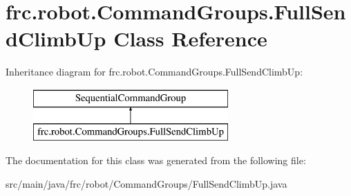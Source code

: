 \hypertarget{classfrc_1_1robot_1_1_command_groups_1_1_full_send_climb_up}{}\section{frc.\+robot.\+Command\+Groups.\+Full\+Send\+Climb\+Up Class Reference}
\label{classfrc_1_1robot_1_1_command_groups_1_1_full_send_climb_up}
Inheritance diagram for frc.\+robot.\+Command\+Groups.\+Full\+Send\+Climb\+Up\+:\begin{figure}[H]
\begin{center}
\leavevmode
\includegraphics[height=2.000000cm]{classfrc_1_1robot_1_1_command_groups_1_1_full_send_climb_up}
\end{center}
\end{figure}


The documentation for this class was generated from the following file\+:\begin{DoxyCompactItemize}
\item 
src/main/java/frc/robot/\+Command\+Groups/Full\+Send\+Climb\+Up.\+java\end{DoxyCompactItemize}
